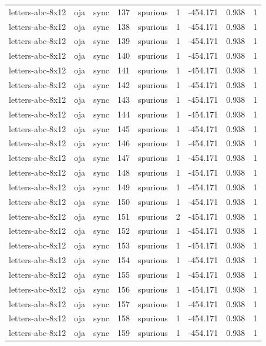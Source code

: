 \begin{tabular}{lllrlrrrr}
letters-abc-8x12 & oja & sync & 137 & spurious & 1 & -454.171 & 0.938 & 1 \\
letters-abc-8x12 & oja & sync & 138 & spurious & 1 & -454.171 & 0.938 & 1 \\
letters-abc-8x12 & oja & sync & 139 & spurious & 1 & -454.171 & 0.938 & 1 \\
letters-abc-8x12 & oja & sync & 140 & spurious & 1 & -454.171 & 0.938 & 1 \\
letters-abc-8x12 & oja & sync & 141 & spurious & 1 & -454.171 & 0.938 & 1 \\
letters-abc-8x12 & oja & sync & 142 & spurious & 1 & -454.171 & 0.938 & 1 \\
letters-abc-8x12 & oja & sync & 143 & spurious & 1 & -454.171 & 0.938 & 1 \\
letters-abc-8x12 & oja & sync & 144 & spurious & 1 & -454.171 & 0.938 & 1 \\
letters-abc-8x12 & oja & sync & 145 & spurious & 1 & -454.171 & 0.938 & 1 \\
letters-abc-8x12 & oja & sync & 146 & spurious & 1 & -454.171 & 0.938 & 1 \\
letters-abc-8x12 & oja & sync & 147 & spurious & 1 & -454.171 & 0.938 & 1 \\
letters-abc-8x12 & oja & sync & 148 & spurious & 1 & -454.171 & 0.938 & 1 \\
letters-abc-8x12 & oja & sync & 149 & spurious & 1 & -454.171 & 0.938 & 1 \\
letters-abc-8x12 & oja & sync & 150 & spurious & 1 & -454.171 & 0.938 & 1 \\
letters-abc-8x12 & oja & sync & 151 & spurious & 2 & -454.171 & 0.938 & 1 \\
letters-abc-8x12 & oja & sync & 152 & spurious & 1 & -454.171 & 0.938 & 1 \\
letters-abc-8x12 & oja & sync & 153 & spurious & 1 & -454.171 & 0.938 & 1 \\
letters-abc-8x12 & oja & sync & 154 & spurious & 1 & -454.171 & 0.938 & 1 \\
letters-abc-8x12 & oja & sync & 155 & spurious & 1 & -454.171 & 0.938 & 1 \\
letters-abc-8x12 & oja & sync & 156 & spurious & 1 & -454.171 & 0.938 & 1 \\
letters-abc-8x12 & oja & sync & 157 & spurious & 1 & -454.171 & 0.938 & 1 \\
letters-abc-8x12 & oja & sync & 158 & spurious & 1 & -454.171 & 0.938 & 1 \\
letters-abc-8x12 & oja & sync & 159 & spurious & 1 & -454.171 & 0.938 & 1 \\

\end{tabular}
